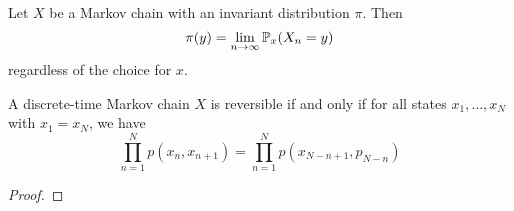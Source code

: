 \begin{thm}
    Let $X$ be a Markov chain with an invariant distribution $\pi$. Then 
    \[\pi(y) = \lim_{n \to \infty} \mathbb{P}_x(X_n=y)\]
    regardless of the choice for $x$.
\end{thm}


\begin{thm}
  A discrete-time Markov chain $X$ is reversible if and only if for all states $x_1,\dots, x_N$ with $x_1=x_N$, we have \[\prod_{n=1}^N p(x_n,x_{n+1}) = \prod_{n=1}^N p(x_{N-n+1},p_{N-n})\]
\end{thm}
\begin{proof}
    
\end{proof}



